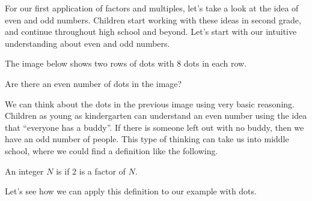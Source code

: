 \documentclass{ximera}
\begin{document}
For our first application of factors and multiples, let's take a look at the idea of even and odd numbers. Children start working with these ideas in second grade, and continue throughout high school and beyond. Let's start with our intuitive understanding about even and odd numbers.

\begin{question}
The image below shows two rows of dots with $8$ dots in each row.
\begin{image}
\end{image}

Are there an even number of dots in the image?
\begin{multipleChoice}
\end{multipleChoice}
\end{question}

We can think about the dots in the previous image using very basic reasoning. Children as young as kindergarten can understand an even number using the idea that ``everyone has a buddy''. If there is someone left out with no buddy, then we have an odd number of people. This type of thinking can take us into middle school, where we could find a definition like the following.
\begin{definition}
An integer $N$ is  if $2$ is a factor of $N$.
\end{definition}

Let's see how we can apply this definition to our example with dots.
\end{document}
